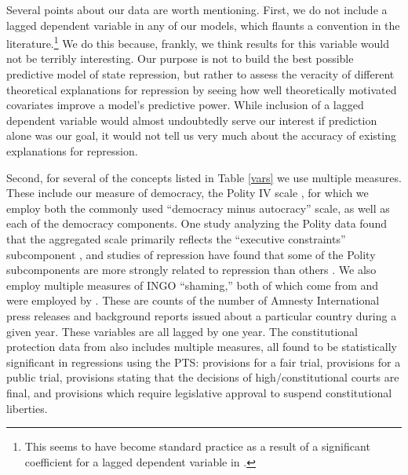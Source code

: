 \documentclass[12pt]{article}
\begin{document}
Several points about our data are worth mentioning. First, we do not include a lagged dependent variable in any of our models, which flaunts a convention in the literature.\footnote{This seems to have become standard practice as a result of a significant coefficient for a lagged dependent variable in \citet{PoeTate1994}.} We do this because, frankly, we think results for this variable would not be terribly interesting. Our purpose is not to build the best possible predictive model of state repression, but rather to assess the veracity of different theoretical explanations for repression by seeing how well theoretically motivated covariates improve a model's predictive power. While inclusion of a lagged dependent variable would almost undoubtedly serve our interest if prediction alone was our goal, it would not tell us very much about the accuracy of existing explanations for repression. 

Second, for several of the concepts listed in Table \ref{vars} we use multiple measures. These include our measure of democracy, the Polity IV scale \citep{MarshallJaggers2009}, for which we employ both the commonly used ``democracy minus autocracy'' scale, as well as each of the democracy components. One study analyzing the Polity data found that the aggregated scale primarily reflects the ``executive constraints'' subcomponent \citep{GleditschWard1997}, and studies of repression have found that some of the Polity subcomponents are more strongly related to repression than others \citep{Keith2002PRQ, BDMetal2005}. We also employ multiple measures of INGO ``shaming,'' both of which come from \citet{RonRamosRodgers2005} and were employed by \citet{HafnerBurton2008}. These are counts of the number of Amnesty International press releases and background reports issued about a particular country during a given year. These variables are all lagged by one year. The constitutional protection data from \citet{KeithTatePoe2009} also includes multiple measures, all found to be statistically significant in regressions using the PTS: provisions for a fair trial, provisions for a public trial, provisions stating that the decisions of high/constitutional courts are final, and provisions which require legislative approval to suspend constitutional liberties. 
\end{document}

